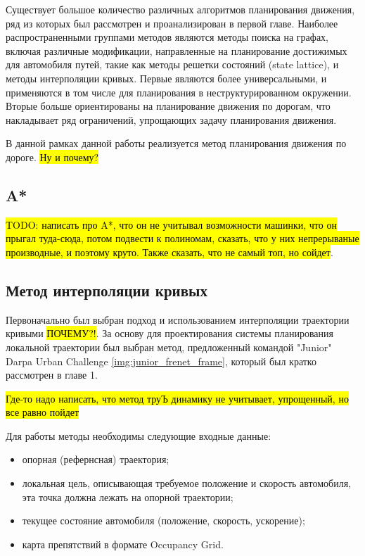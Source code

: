 Существует большое количество различных алгоритмов планирования движения, ряд из которых был рассмотрен и проанализирован
в первой главе. Наиболее распространенными группами методов являются методы поиска на графах, включая различные
модификации, направленные на планирование достижимых для автомобиля путей, такие как методы решетки состояний
(state lattice), и методы интерполяции кривых. Первые являются более универсальными, и применяются в том числе для
планирования в неструктурированном окружении. Вторые больше ориентированы на планирование движения по дорогам, что
накладывает ряд ограничений, упрощающих задачу планирования движения.

В данной рамках данной работы реализуется метод планирования движения по дороге. \hl{Ну и почему?}

\subsection{A*}

\hl{TODO: написать про A*, что он не учитывал возможности машинки, что он прыгал туда-сюда, потом подвести к
полиномам, сказать, что у них непрерываные производные, и поэтому круто. Также сказать, что не самый топ, но сойдет}.

\subsection{Метод интерполяции кривых}
Первоначально был выбран подход и использованием интерполяции траектории кривыми \hl{ПОЧЕМУ?!}. За основу для
проектирования системы планирования локальной траектории был выбран метод, предложенный командой "Junior" Darpa
Urban Challenge \ref{img:junior_frenet_frame}, который был кратко рассмотрен в главе 1.

\hl{Где-то надо написать, что метод труЪ динамику не учитывает, упрощенный, но все равно пойдет}

Для работы методы необходимы следующие входные данные:
\begin{itemize}
      \item опорная (рефернсная) траектория;
      \item локальная цель, описывающая требуемое положение и скорость автомобиля, эта точка должна
            лежать на опорной траектории;
      \item текущее состояние автомобиля (положение, скорость, ускорение);
      \item карта препятствий в формате Occupancy Grid.
\end{itemize}

